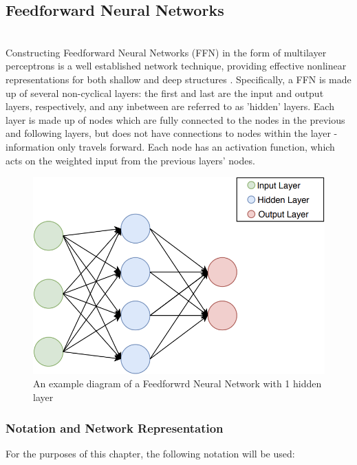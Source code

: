\documentclass[a4paper,11pt,oneside]{article}
\theoremstyle{plain}
\theoremstyle{definition}
\begin{document}
\subsection{Feedforward Neural Networks}\label{imp_ffn}
~\\
Constructing Feedforward Neural Networks (FFN) in the form of multilayer perceptrons is a well established network technique, providing effective nonlinear representations for both shallow and deep structures \cite{Schmidhuber}. Specifically, a FFN is made up of several non-cyclical layers: the first and last are the input and output layers, respectively, and any inbetween are referred to as 'hidden' layers. Each layer is made up of nodes which are fully connected to the nodes in the previous and following layers, but does not have connections to nodes within the layer - information only travels forward. Each 
node has an activation function, which acts on the weighted input from the previous layers' nodes.

\begin{figure}[H]
	\centering 
	\includegraphics[scale=0.5]{images/implementation/neural_network_diagram.png}
	\caption{An example diagram of a Feedforwrd Neural Network with 1 hidden layer}
	\label{figure-neural_network_diagram}
\end{figure}		

\subsubsection{Notation and Network Representation}\label{imp_ffn_functions}

For the purposes of this chapter, the following notation will be used:
\end{document}
